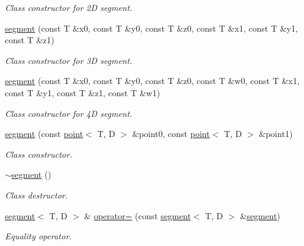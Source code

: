 \begin{DoxyCompactItemize}
\begin{DoxyCompactList}\small\item\em Class constructor for 2D segment. \end{DoxyCompactList}\item 
\mbox{\label{classacme_1_1segment_af4676b55f020641b846e55e7c163d4a9}} 
\hyperlink{classacme_1_1segment_af4676b55f020641b846e55e7c163d4a9}{segment} (const T \&x0, const T \&y0, const T \&z0, const T \&x1, const T \&y1, const T \&z1)
\begin{DoxyCompactList}\small\item\em Class constructor for 3D segment. \end{DoxyCompactList}\item 
\mbox{\label{classacme_1_1segment_af0ffe9ab1f170574236a0ee839109dee}} 
\hyperlink{classacme_1_1segment_af0ffe9ab1f170574236a0ee839109dee}{segment} (const T \&x0, const T \&y0, const T \&z0, const T \&w0, const T \&x1, const T \&y1, const T \&z1, const T \&w1)
\begin{DoxyCompactList}\small\item\em Class constructor for 4D segment. \end{DoxyCompactList}\item 
\hyperlink{classacme_1_1segment_af0b4da3b6d22d0e294fbf515b675d687}{segment} (const \hyperlink{classacme_1_1point}{point}$<$ T, D $>$ \&point0, const \hyperlink{classacme_1_1point}{point}$<$ T, D $>$ \&point1)
\begin{DoxyCompactList}\small\item\em Class constructor. \end{DoxyCompactList}\item 
\mbox{\label{classacme_1_1segment_a014e93a736cd52d07f6478a4640a6ec6}} 
\hyperlink{classacme_1_1segment_a014e93a736cd52d07f6478a4640a6ec6}{$\sim$segment} ()
\begin{DoxyCompactList}\small\item\em Class destructor. \end{DoxyCompactList}\item 
\hyperlink{classacme_1_1segment}{segment}$<$ T, D $>$ \& \hyperlink{classacme_1_1segment_a5b62f05585b6d9e1f7189467358e2c54}{operator=} (const \hyperlink{classacme_1_1segment}{segment}$<$ T, D $>$ \&\hyperlink{classacme_1_1segment}{segment})
\begin{DoxyCompactList}\small\item\em Equality operator. \end{DoxyCompactList}\item 

\end{DoxyCompactItemize}
